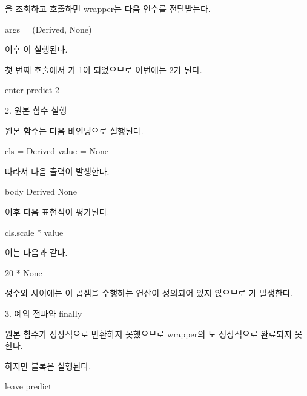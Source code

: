을 조회하고 호출하면 wrapper는 다음 인수를 전달받는다.

\begin{dhkzsh}
args = (Derived, None)
\end{dhkzsh}

이후 이 실행된다.

첫 번째 호출에서 가 1이 되었으므로 이번에는 2가 된다.

\begin{dhkzsh}
enter predict 2
\end{dhkzsh}

\begin{dhknote}
\begin{dhksmry}[centered]
2. 원본 함수 실행
\end{dhksmry}
\end{dhknote}

원본 함수는 다음 바인딩으로 실행된다.

\begin{dhkzsh}
cls = Derived
value = None
\end{dhkzsh}

따라서 다음 출력이 발생한다.

\begin{dhkzsh}
body Derived None
\end{dhkzsh}

이후 다음 표현식이 평가된다.

\begin{dhkcode}
cls.scale * value
\end{dhkcode}

이는 다음과 같다.

\begin{dhkcode}
20 * None
\end{dhkcode}

정수와  사이에는 이 곱셈을 수행하는 연산이 정의되어 있지 않으므로 가 발생한다.

\begin{dhknote}
\begin{dhksmry}[centered]
3. 예외 전파와 finally
\end{dhksmry}
\end{dhknote}

원본 함수가 정상적으로 반환하지 못했으므로 wrapper의 도 정상적으로 완료되지 못한다.

하지만  블록은 실행된다.

\begin{dhkzsh}
leave predict
\end{dhkzsh}

